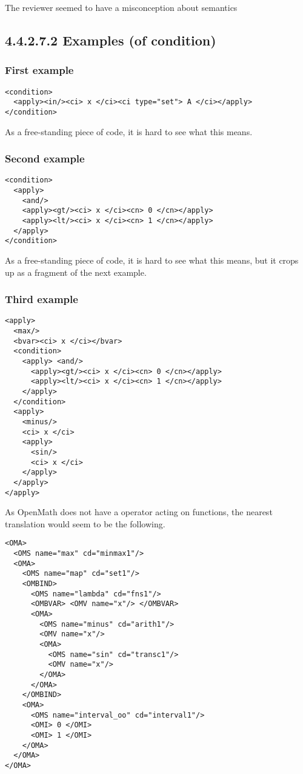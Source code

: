 \documentclass{llncs}
\begin{document}
\begin{newpart}{The reviewer seemed to have a misconception about semantics}
\subsection{4.4.2.7.2 Examples (of condition)}\label{44272}
\subsubsection{First example}\label{442721}
\begin{lstlisting}[language=MathML2]
<condition>
  <apply><in/><ci> x </ci><ci type="set"> A </ci></apply>
</condition>
\end{lstlisting}
As a free-standing piece of code, it is hard to see what this means.
\subsubsection{Second example}\label{442722}
\begin{lstlisting}[language=MathML2]
<condition>
  <apply>
    <and/>
    <apply><gt/><ci> x </ci><cn> 0 </cn></apply>
    <apply><lt/><ci> x </ci><cn> 1 </cn></apply>
  </apply>
</condition>
\end{lstlisting}
As a free-standing piece of code, it is hard to see what this means, but it
crops up as a fragment of the next example.
\subsubsection{Third example}\label{442723}
\begin{lstlisting}[language=MathML2]
<apply>
  <max/>
  <bvar><ci> x </ci></bvar>
  <condition>
    <apply> <and/>
      <apply><gt/><ci> x </ci><cn> 0 </cn></apply>
      <apply><lt/><ci> x </ci><cn> 1 </cn></apply>
    </apply>
  </condition>
  <apply>
    <minus/>
    <ci> x </ci>
    <apply>
      <sin/>
      <ci> x </ci>
    </apply>
  </apply>
</apply>
\end{lstlisting}
As OpenMath does not have a {} operator acting on functions,
the nearest translation would seem to be the following.
\begin{lstlisting} 
<OMA>
  <OMS name="max" cd="minmax1"/>
  <OMA>
    <OMS name="map" cd="set1"/>
    <OMBIND>
      <OMS name="lambda" cd="fns1"/>
      <OMBVAR> <OMV name="x"/> </OMBVAR>
      <OMA>
        <OMS name="minus" cd="arith1"/>
        <OMV name="x"/>
        <OMA>
          <OMS name="sin" cd="transc1"/>
          <OMV name="x"/>
        </OMA>
      </OMA>
    </OMBIND>
    <OMA>
      <OMS name="interval_oo" cd="interval1"/>
      <OMI> 0 </OMI>
      <OMI> 1 </OMI>
    </OMA>
  </OMA>
</OMA>
\end{lstlisting}

\end{newpart}
\end{document}
